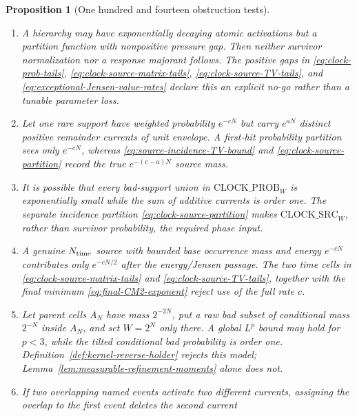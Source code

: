\documentclass[11pt]{article}
\newtheorem{proposition}[theorem]{Proposition}
\begin{document}
\begin{proposition}[One hundred and fourteen obstruction tests]
\begin{enumerate}[label=\textup{(T\arabic*)}]
      endpoint scale, or $\widetilde G_N^\pm$.  The survivor indicator in
      \eqref{eq:upper-scale-excess-tail} prevents the upper-scale ledger from
      evaluating a nonexistent random variable; cemetery mass is charged by
      $\mathrm{CEM\_DOM}$ and $\mathrm{CLOCK\_PROB}_{W}$.
\item A hierarchy may have exponentially decaying atomic activations but a
      partition function with nonpositive pressure gap.  Then neither
      survivor normalization nor a response majorant follows.  The positive
      gaps in \eqref{eq:clock-prob-tails},
      \eqref{eq:clock-source-matrix-tails},
      \eqref{eq:clock-source-TV-tails}, and
      \eqref{eq:exceptional-Jensen-value-rates} declare this an explicit
      no-go rather than a tunable parameter loss.
\item Let one rare support have weighted probability $e^{-cN}$ but carry
      $e^{aN}$ distinct positive remainder currents of unit envelope.  A
      first-hit probability partition sees only $e^{-cN}$, whereas
      \eqref{eq:source-incidence-TV-bound} and
      \eqref{eq:clock-source-partition} record the true
      $e^{-(c-a)N}$ source mass.
\item It is possible that every bad-support union in
      $\mathrm{CLOCK\_PROB}_{W}$ is exponentially small while the sum of
      additive currents is order one.  The separate incidence partition
      \eqref{eq:clock-source-partition} makes
      $\mathrm{CLOCK\_SRC}_{W}$, rather than survivor probability, the
      required phase input.
\item A genuine $N_{\rm time}$ source with bounded base occurrence mass and
      energy $e^{-cN}$ contributes only $e^{-cN/2}$ after the
      energy/Jensen passage.  The two time
      cells in \eqref{eq:clock-source-matrix-tails} and
      \eqref{eq:clock-source-TV-tails}, together with the final minimum
      \eqref{eq:final-CM2-exponent} reject use of the full rate $c$.
\item Let parent cells $A_N$ have mass $2^{-2N}$, put a raw bad subset of
      conditional mass $2^{-N}$ inside $A_N$, and set $W=2^N$ only there.
      A global $L^p$ bound may hold for $p<3$, while the tilted conditional
      bad probability is order one.  Definition~\ref{def:kernel-reverse-holder}
      rejects this model; Lemma~\ref{lem:measurable-refinement-moments} alone
      does not.
\item If two overlapping named events activate two different currents,
      assigning the overlap to the first event deletes the second current

\end{enumerate}
\end{proposition}
\end{document}
